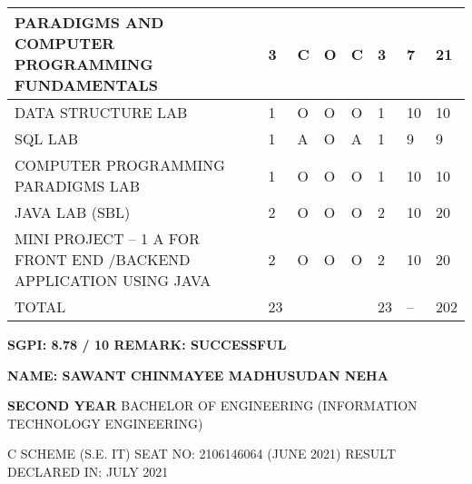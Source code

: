 \documentclass{article} %
\begin{document}
\begin{tabular}{|p{0.9in}|p{0.5in}|p{0.4in}|p{0.3in}|p{0.5in}|p{0.5in}|p{0.6in}|p{0.7in}|}
PARADIGMS AND COMPUTER PROGRAMMING FUNDAMENTALS & 3\newline  & C & O & C & 3\newline  & 7 & 21 \\ \hline 
DATA STRUCTURE LAB & 1\newline  & O\newline  & O & O\newline  & 1\newline  & 10\newline  & 10\newline  \\ \hline 
SQL LAB & 1 & A & O & A & 1 & 9 & 9 \\ \hline 
COMPUTER PROGRAMMING PARADIGMS LAB & 1 & O & O & O & 1 & 10 & 10 \\ \hline 
JAVA LAB (SBL) & 2 & O & O & O & 2 & 10 & 20 \\ \hline 
MINI PROJECT -- 1 A FOR FRONT END /BACKEND APPLICATION USING JAVA & 2 & O & O & O & 2 & 10 & 20 \\ \hline 
TOTAL & 23 &  &  &  & 23 & -- & 202 \\ \hline 
\end{tabular}

\textbf{}

\noindent \textbf{SGPI: 8.78 / 10                                                                          REMARK: SUCCESSFUL}

\noindent 

\noindent \textbf{\underbar{}}

\textbf{\underbar{}}

\textbf{}

\textbf{\underbar{}}

\textbf{NAME: SAWANT CHINMAYEE MADHUSUDAN NEHA}

\noindent \textbf{}

\noindent \textbf{SECOND YEAR} BACHELOR OF ENGINEERING (INFORMATION TECHNOLOGY ENGINEERING)

\noindent \textbf{\underbar{}}

\noindent \textbf{  }C SCHEME (S.E. IT)     SEAT NO: 2106146064 (JUNE 2021)              RESULT DECLARED IN: JULY 2021

\noindent 

\noindent 
\end{document}
